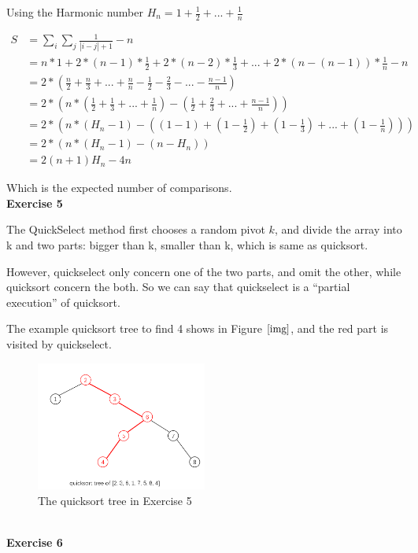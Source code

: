 \documentclass{article}
\begin{document}
Using the Harmonic number $H_{n} = 1+ \frac{1}{2} + ... + \frac{1}{n}$

\begin{align*}
 S  &= \sum_{i}\sum_{j} \frac{1}{|i-j| + 1} - n\\
    &= n*1 + 2*(n-1)*\frac{1}{2} + 2*(n-2)*\frac{1}{3} + ... + 2*(n-(n-1))*\frac{1}{n} - n\\
    &= 2*(\frac{n}{2} + \frac{n}{3} + ... + \frac{n}{n} -\frac{1}{2} - \frac{2}{3} - ... - \frac{n-1}{n})\\
    &= 2*( n*(\frac{1}{2} + \frac{1}{3} + ... + \frac{1}{n}) - (\frac{1}{2} + \frac{2}{3} + ... + \frac{n-1}{n}) )\\
    &= 2*( n*(H_{n} - 1) - ((1-1) +  (1-\frac{1}{2}) + (1 - \frac{1}{3}) + ... + (1-\frac{1}{n}) ) )\\
    &= 2*( n*(H_{n} - 1) - (n - H_{n}) )\\
    &= 2(n+1)H_{n} - 4n 
\end{align*}

Which is the expected number of comparisons.
~\\
\textbf{Exercise 5}

The QuickSelect method first chooses a random pivot $k$, and divide the array into k and two parts: bigger than k, smaller than k, which is same as quicksort.

However, quickselect only concern one of the two parts, and omit the other, while quicksort concern the both. So we can say that quickselect is a “partial execution” of quicksort.

The example quicksort tree to find 4 shows in Figure $\ref{img}$, and the red part is visited by quickselect.

\begin{figure}
		\centering
		\includegraphics[width=0.5\textwidth]{1.png}
		\caption{
		The quicksort tree in Exercise 5} 
		\label{img}
	\end{figure}

~\\
\textbf{Exercise 6}
\end{document}
